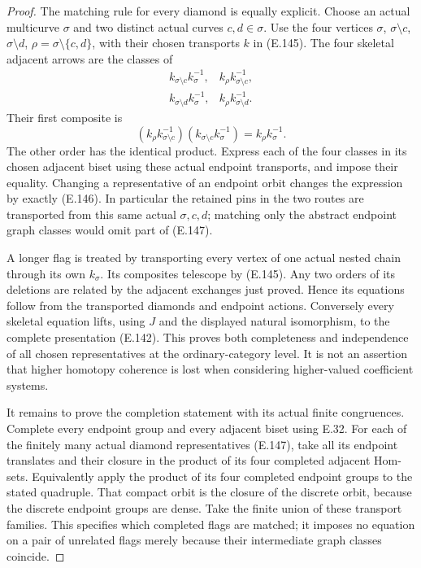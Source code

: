 \begin{proof}
The matching rule for every diamond is equally explicit.
Choose an actual multicurve $\sigma$ and two distinct actual
curves $c,d\in\sigma$.  Use the four vertices
$\sigma$, $\sigma\setminus c$, $\sigma\setminus d$,
$\rho=\sigma\setminus\{c,d\}$, with their chosen
transports $k$ in (E.145).  The four skeletal adjacent
arrows are the classes of
\[
 \begin{array}{ll}
 k_{\sigma\setminus c}k_\sigma^{-1},&
 k_\rho k_{\sigma\setminus c}^{-1},\\
 k_{\sigma\setminus d}k_\sigma^{-1},&
 k_\rho k_{\sigma\setminus d}^{-1}.
 \end{array}
\]
Their first composite is
\[
 (k_\rho k_{\sigma\setminus c}^{-1})
 (k_{\sigma\setminus c}k_\sigma^{-1})
   =k_\rho k_\sigma^{-1}.                                    \tag{E.147}
\]
The other order has the identical product.  Express each
of the four classes in its chosen adjacent biset using
these actual endpoint transports, and impose their equality.
Changing a representative of an endpoint orbit changes the
expression by exactly (E.146).  In particular the retained
pins in the two routes are transported from this same
actual $\sigma,c,d$; matching only the abstract endpoint
graph classes would omit part of (E.147).

A longer flag is treated by transporting every vertex of
one actual nested chain through its own $k_\sigma$.
Its composites telescope by (E.145).  Any two orders of
its deletions are related by the adjacent exchanges just
proved.  Hence its equations follow from the transported
diamonds and endpoint actions.  Conversely every skeletal
equation lifts, using $J$ and the displayed natural
isomorphism, to the complete presentation (E.142).
This proves both completeness and independence of all
chosen representatives at the ordinary-category level.
It is not an assertion that higher homotopy coherence is
lost when considering higher-valued coefficient systems.

It remains to prove the completion statement with its
actual finite congruences.  Complete every endpoint group
and every adjacent biset using E.32.  For each of the
finitely many actual diamond representatives (E.147),
take all its endpoint translates and their closure in
the product of its four completed adjacent Hom-sets.
Equivalently apply the product of its four completed
endpoint groups to the stated quadruple.  That compact
orbit is the closure of the discrete orbit, because
the discrete endpoint groups are dense.  Take the
finite union of these transport families.  This specifies
which completed flags are matched; it imposes no equation
on a pair of unrelated flags merely because their
intermediate graph classes coincide.


\end{proof}

